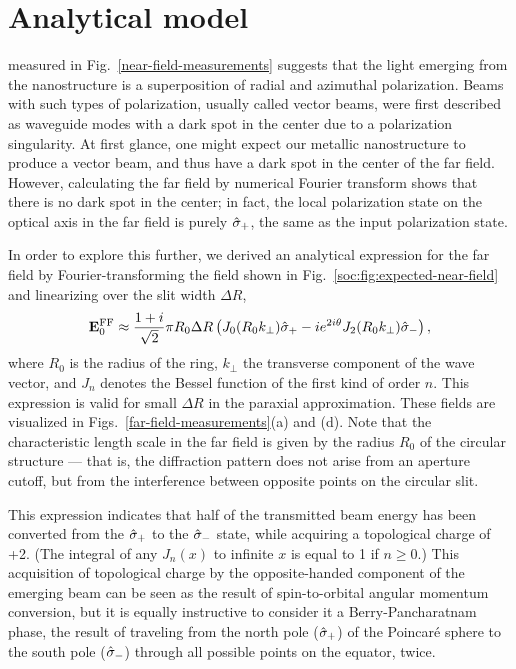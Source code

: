 \section{Analytical model}

 measured in Fig.~\ref{near-field-measurements} suggests that the light emerging from the nanostructure is a superposition of radial and azimuthal polarization. Beams with such types of polarization, usually called vector beams, were first described as waveguide modes \cite{Marcatili1964} with a dark spot in the center due to a polarization singularity. At first glance, one might expect our metallic nanostructure to produce a vector beam, and thus have a dark spot in the center of the far field. However, calculating the far field by numerical Fourier transform shows that there is no dark spot in the center; in fact, the local polarization state on the optical axis in the far field is purely $\hat{\mathbf{\sigma}}_{+}$, the same as the input polarization state.

In order to explore this further, we derived an analytical expression for the far field by Fourier-transforming the field shown in Fig.~\ref{soc:fig:expected-near-field} and linearizing over the slit width $\Delta R$,
%
\begin{equation}\label{far-field}
\mathbf{E}_{0}^{\text{FF}} \approx  \frac{1+i}{\sqrt {2}}\pi R_{0}\Delta R \left(J_{0}(R_{0}k_{\perp }) \hat{\mathbf{\sigma}}_{+} - ie^{2i\theta } J_{2}(R_{0}k_{\perp }) \hat{\mathbf{\sigma}}_{-}\right),
\end{equation}
%
where $R_{0}$ is the radius of the ring, $k_{\perp }$ the transverse component of the wave vector, and $J_{n}$ denotes the Bessel function of the first kind of order $n$. This expression is valid for small $\Delta R$ in the paraxial approximation. These fields are visualized in Figs.~\ref{far-field-measurements}(a) and (d). Note that the characteristic length scale in the far field is given by the radius $R_{0}$ of the circular structure --- that is, the diffraction pattern does not arise from an aperture cutoff, but from the interference between opposite points on the circular slit.

This expression indicates that half of the transmitted beam energy has been converted from the $\hat{\mathbf{\sigma}}_{+}$ to the $\hat{\mathbf{\sigma}}_{-}$ state, while acquiring a topological charge of +2. (The integral of any $J_n(x)$ to infinite $x$ is equal to 1 if $n\geq 0$.) This acquisition of topological charge by the opposite-handed component of the emerging beam can be seen as the result of spin-to-orbital angular momentum conversion, but it is equally instructive to consider it a Ber\-ry-Pan\-cha\-rat\-nam phase, the result of traveling from the north pole ($\hat{\mathbf{\sigma}}_{+}$) of the Poin\-ca\-r\'{e} sphere to the south pole ($\hat{\mathbf{\sigma}}_{-}$) through all possible points on the equator, twice.

